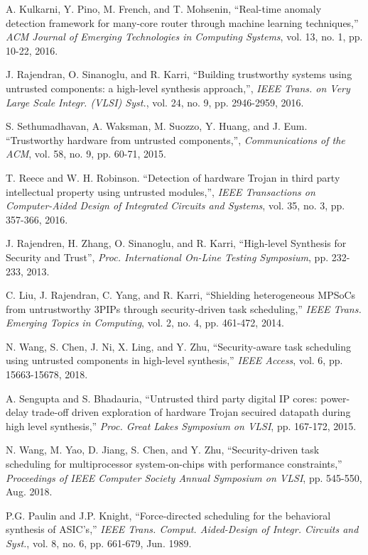 \documentclass[10pt,journal]{IEEEtran}
\begin{document}
\begin{thebibliography}{99}
A. Kulkarni, Y. Pino, M. French, and T. Mohsenin, ``Real-time anomaly detection framework for many-core router through machine learning techniques,'' \textit{ACM Journal of Emerging Technologies in Computing Systems}, vol. 13, no. 1, pp. 10-22, 2016.

J. Rajendran, O. Sinanoglu, and R. Karri, ``Building trustworthy systems using untrusted components: a high-level synthesis approach,'', \textit{IEEE Trans. on Very Large Scale Integr. (VLSI) Syst.}, vol. 24, no. 9, pp. 2946-2959, 2016.

S. Sethumadhavan, A. Waksman, M. Suozzo, Y. Huang, and J. Eum. ``Trustworthy hardware from untrusted components,'', \textit{Communications of the ACM}, vol. 58, no. 9, pp. 60-71, 2015.

T. Reece and W. H. Robinson. ``Detection of hardware Trojan in third party intellectual property using untrusted modules,'', \textit{IEEE Transactions on Computer-Aided Design of Integrated Circuits and Systems}, vol. 35, no. 3, pp. 357-366, 2016.


J. Rajendren, H. Zhang, O. Sinanoglu, and R. Karri, ``High-level Synthesis for Security and Trust'', \textit{Proc. International On-Line Testing Symposium}, pp. 232-233, 2013.

C. Liu, J. Rajendran, C. Yang, and R. Karri, ``Shielding heterogeneous MPSoCs from untrustworthy 3PIPs through security-driven task scheduling,'' \textit{IEEE Trans. Emerging Topics in Computing}, vol. 2, no. 4, pp. 461-472, 2014.

N. Wang, S. Chen, J. Ni, X. Ling, and Y. Zhu, ``Security-aware task scheduling using untrusted components in high-level synthesis,'' \textit{IEEE Access}, vol. 6, pp. 15663-15678, 2018.


A. Sengupta and S. Bhadauria, ``Untrusted third party digital IP cores: power-delay trade-off driven exploration of hardware Trojan secuired datapath during high level synthesis,'' \textit{Proc. Great Lakes Symposium on VLSI}, pp. 167-172, 2015.

N. Wang, M. Yao, D. Jiang, S. Chen, and Y. Zhu, ``Security-driven task scheduling for multiprocessor system-on-chips with performance constraints,'' \textit{Proceedings of IEEE Computer Society Annual Symposium on VLSI}, pp. 545-550, Aug. 2018.

P.G. Paulin and J.P. Knight, ``Force-directed scheduling for the behavioral synthesis of ASIC's,''  \textit{IEEE Trans. Comput. Aided-Design of Integr. Circuits and Syst.}, vol. 8, no. 6, pp. 661-679, Jun. 1989.



\end{thebibliography}
\end{document}
